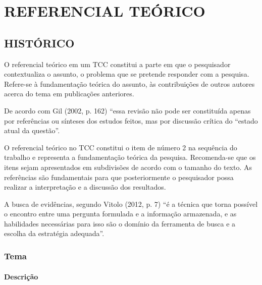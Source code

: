 \chapter{REFERENCIAL TEÓRICO}
\label{fundamentacao}

\section{HISTÓRICO}
O referencial teórico em um TCC constitui a parte em que o pesquisador contextualiza o assunto, o problema que se pretende responder com a pesquisa. Refere-se à fundamentação teórica do assunto, às contribuições de outros autores acerca do tema em publicações anteriores.

De acordo com Gil (2002, p. 162) “essa revisão não pode ser constituída apenas por referências ou sínteses dos estudos feitos, mas por discussão crítica do “estado atual da questão”.

O referencial teórico no TCC constitui o item de número 2 na sequência do trabalho e representa a fundamentação teórica da pesquisa. Recomenda-se que os itens sejam apresentados em subdivisões de acordo com o tamanho do texto. As referências são fundamentais para que posteriormente o pesquisador possa realizar a interpretação e a discussão dos resultados.

A busca de evidências, segundo Vitolo (2012, p. 7) “é a técnica que torna possível o encontro entre uma pergunta formulada e a informação armazenada, e as habilidades necessárias para isso são o domínio da ferramenta de busca e a escolha da estratégia adequada”.

\subsection{Tema}

\subsubsection{Descrição}

